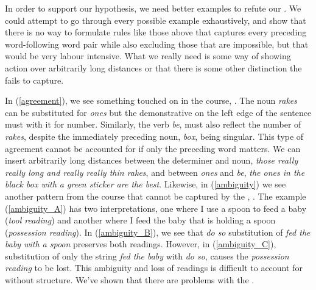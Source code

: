 \documentclass{article}
\begin{document}
In order to support our hypothesis, we need better examples to refute our .
We could attempt to go through every possible example exhaustively, and show that there is no way to formulate rules like those above that captures every preceding word-following word pair while also excluding those that are impossible, but that would be very labour intensive. 
What we really need is some way of showing action over arbitrarily long distances or that there is some other distinction the  fails to capture.

\begin{exe}
    \label{agreement}
    \label{ambiguity}
\end{exe}
In (\ref{agreement}), we see something touched on in the course, .
The noun \emph{rakes} can be substituted for \emph{ones} but the demonstrative on the left edge of the sentence must  with it for number.
Similarly, the verb \emph{be}, must also reflect the number of \emph{rakes}, despite the immediately preceding noun, \emph{box}, being singular.
This type of agreement cannot be accounted for if only the preceding word matters.
We can insert arbitrarily long distances between the determiner and noun, \emph{those really really long and really really thin rakes}, and between \emph{ones} and \emph{be}, \emph{the ones in the black box with a green sticker are the best}.
Likewise, in (\ref{ambiguity}) we see another pattern from the course that cannot be captured by the , .
The example (\ref{ambiguity_A}) has two interpretations, one where I use a spoon to feed a baby (\emph{tool reading}) and another where I feed the baby that is holding a spoon (\emph{possession reading}).
In (\ref{ambiguity_B}), we see that \emph{do so} substitution of \emph{fed the baby with a spoon} preserves both readings.
However, in (\ref{ambiguity_C}), substitution of only the string \emph{fed the baby} with \emph{do so}, causes the \emph{possession reading} to be lost.
This ambiguity and loss of readings is difficult to account for without structure.
We've shown that there are problems with the .
\end{document}

